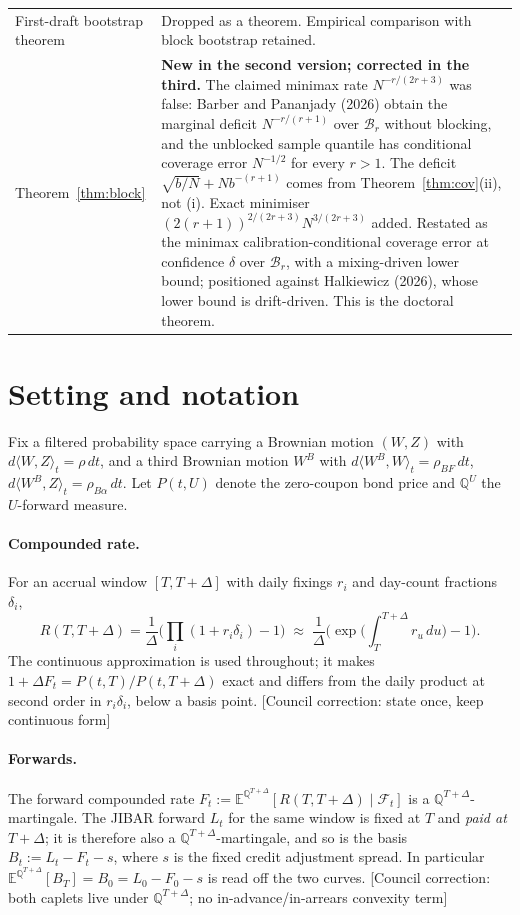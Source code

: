 \documentclass[11pt,a4paper]{article}
\newcommand{\corr}[1]{{\color{ox}\textsf{\small [Council correction: #1]}}}
\theoremstyle{plain}
\theoremstyle{definition}
\theoremstyle{remark}
\newcommand{\E}{\mathbb{E}}
\newcommand{\Q}{\mathbb{Q}}
\begin{document}
\begin{center}
\begin{tabular}{@{}p{}p{}@{}}
First-draft bootstrap theorem & Dropped as a theorem. Empirical comparison with block bootstrap retained. \\
Theorem~\ref{thm:block} & \textbf{New in the second version; corrected in the third.} The claimed minimax rate $N^{-r/(2r+3)}$ was false: Barber and Pananjady (2026) obtain the marginal deficit $N^{-r/(r+1)}$ over $\mathcal B_r$ without blocking, and the unblocked sample quantile has conditional coverage error $N^{-1/2}$ for every $r>1$. The deficit $\sqrt{b/N}+Nb^{-(r+1)}$ comes from Theorem~\ref{thm:cov}(ii), not (i). Exact minimiser $(2(r+1))^{2/(2r+3)}N^{3/(2r+3)}$ added. Restated as the minimax calibration-conditional coverage error at confidence $\delta$ over $\mathcal B_r$, with a mixing-driven lower bound; positioned against Halkiewicz (2026), whose lower bound is drift-driven. This is the doctoral theorem. \\
\bottomrule
\end{tabular}
\end{center}

\section{Setting and notation}

Fix a filtered probability space carrying a Brownian motion $(W,Z)$ with $d\langle W,Z\rangle_t=\rho\,dt$, and a third Brownian motion $W^B$ with $d\langle W^B,W\rangle_t=\rho_{BF}\,dt$, $d\langle W^B,Z\rangle_t=\rho_{B\alpha}\,dt$. Let $P(t,U)$ denote the zero-coupon bond price and $\Q^{U}$ the $U$-forward measure.

\paragraph{Compounded rate.} For an accrual window $[T,T+\Delta]$ with daily fixings $r_i$ and day-count fractions $\delta_i$,
\begin{equation}
R(T,T+\Delta)=\frac{1}{\Delta}\Big(\prod_i(1+r_i\delta_i)-1\Big)\;\approx\;\frac{1}{\Delta}\Big(\exp\!\Big(\int_T^{T+\Delta}r_u\,du\Big)-1\Big).
\end{equation}
The continuous approximation is used throughout; it makes $1+\Delta F_t=P(t,T)/P(t,T+\Delta)$ exact and differs from the daily product at second order in $r_i\delta_i$, below a basis point. \corr{state once, keep continuous form}

\paragraph{Forwards.} The forward compounded rate $F_t:=\E^{\Q^{T+\Delta}}[R(T,T+\Delta)\mid\mathcal F_t]$ is a $\Q^{T+\Delta}$-martingale. The JIBAR forward $L_t$ for the same window is fixed at $T$ and \emph{paid at $T+\Delta$}; it is therefore also a $\Q^{T+\Delta}$-martingale, and so is the basis $B_t:=L_t-F_t-s$, where $s$ is the fixed credit adjustment spread. In particular $\E^{\Q^{T+\Delta}}[B_T]=B_0=L_0-F_0-s$ is read off the two curves. \corr{both caplets live under $\Q^{T+\Delta}$; no in-advance/in-arrears convexity term}
\end{document}
